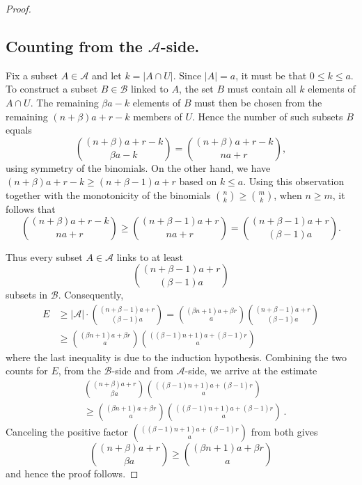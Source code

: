 \documentclass[11pt]{amsart}
\begin{document}
\begin{proof}
\subsection*{Counting from the $\mathcal{A}$-side.}
Fix a subset $A\in\mathcal{A}$ and let $k=|A\cap U|$. Since $|A|=a$, it must be that $0\leq k\leq a$.
To construct a subset $B\in\mathcal{B}$ linked to $A$, the set $B$ must contain all $k$ elements of $A\cap U$. 
The remaining $\beta a-k$ elements of $B$ must then be chosen from the remaining $(n+\beta)a+r-k$ members of $U$.
Hence the number of such subsets $B$ equals
$$\binom{(n+\beta)a+r-k}{\beta a-k}=\binom{(n+\beta)a+r-k}{na+r},$$
using symmetry of the binomials. On the other hand, we have $(n+\beta)a+r-k \geq (n+\beta-1)a+r$
based on $k\leq a$. Using this observation together with the monotonicity of the binomials $\binom{n}k\geq\binom{m}k$, when $n\geq m$, it follows that
$$\binom{(n+\beta)a+r-k}{na+r} \geq \binom{(n+\beta-1)a+r}{na+r}=\binom{(n+\beta-1)a+r}{(\beta-1)a}.$$

Thus every subset $A\in\mathcal{A}$ links to at least
$$
\binom{(n+\beta-1)a+r}{(\beta-1)a}
$$
subsets in $\mathcal{B}$. Consequently,
\begin{align*}
 E &\geq |\mathcal{A}|\cdot \binom{(n+\beta-1)a+r}{(\beta-1)a} = \binom{(\beta n+1)a+\beta r}a \binom{(n+\beta-1)a+r}{(\beta-1)a} \\
& \geq \binom{(\beta n+1)a+\beta r}a \binom{((\beta-1)n+1)a+(\beta-1)r}a
\end{align*}
where the last inequality is due to the induction hypothesis. %
Combining the two counts for $E$, from the $\mathcal{B}$-side and from $\mathcal{A}$-side, 
we arrive at the estimate
\begin{align*}
&\binom{(n+\beta)a+r}{\beta a} \binom{((\beta-1)n+1)a+(\beta-1)r}a \\
&\geq \binom{(\beta n+1)a+\beta r}a \binom{((\beta-1)n+1)a+(\beta-1)r}a \, .
\end{align*}
Canceling the positive factor $\binom{((\beta-1)n+1)a+(\beta-1)r}a$ from both gives
$$
\binom{(n+\beta)a+r}{\beta a} \ge \binom{(\beta n+1)a+\beta r}a
$$
and hence the proof follows.
\end{proof}




\setlength{\parskip}{0cm} 
\end{document}
